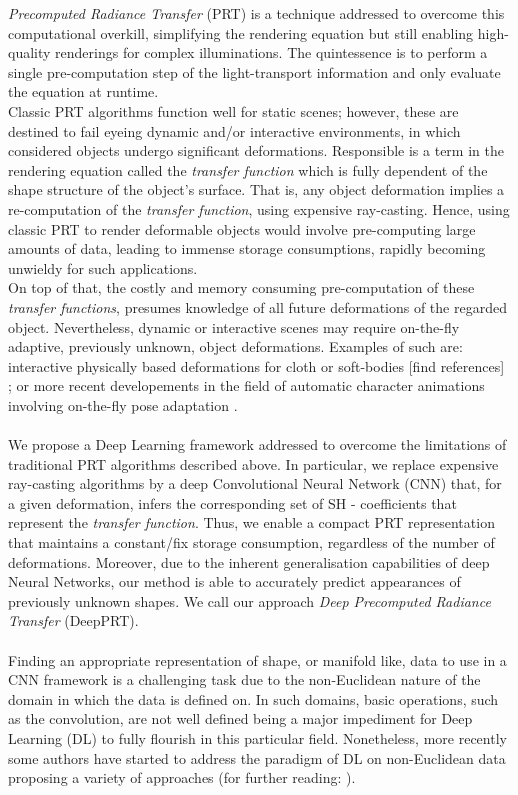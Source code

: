 \textit{Precomputed Radiance Transfer} (PRT) is a technique addressed to overcome this computational overkill, simplifying the rendering equation but still enabling high-quality renderings for complex illuminations. The quintessence is to perform a single pre-computation step of the light-transport information and only evaluate the equation at runtime.\\
Classic PRT algorithms function well for static scenes; however, these are destined to fail eyeing dynamic and/or interactive environments, in which considered objects undergo significant deformations.
Responsible is a term in the rendering equation called the \textit{transfer function} which is fully dependent of the shape structure of the object's surface. That is, any object deformation implies a re-computation of the \textit{transfer function},  using expensive ray-casting. Hence, using classic PRT to render deformable objects would involve pre-computing large amounts of data, leading to immense storage consumptions, rapidly becoming unwieldy for such applications.  \\
On top of that, the costly and memory consuming pre-computation of these \textit{transfer functions}, presumes knowledge of all future deformations of the regarded object. Nevertheless, dynamic or interactive scenes may require on-the-fly adaptive, previously unknown, object deformations. Examples of such are: 
interactive physically based deformations for cloth or soft-bodies [find references] ; 
or more recent developements in the field of automatic character animations involving on-the-fly pose adaptation \cite{DeepHuman,Holden2017, QuadrupedMotion}. \\
\\
We propose a Deep Learning framework addressed to overcome the limitations of traditional PRT algorithms described above. In particular, we replace expensive ray-casting algorithms by a deep Convolutional Neural Network (CNN) that, for a given deformation, infers the corresponding set of SH - coefficients that represent the \textit{transfer function}. 
Thus, we enable a compact PRT representation that maintains a constant/fix storage consumption, regardless of the number of deformations. Moreover, due to the inherent generalisation capabilities of deep Neural Networks, our method is able to accurately predict appearances of previously unknown shapes. We call our approach \textit{Deep Precomputed Radiance Transfer} (DeepPRT). \\
\\
Finding an appropriate representation of shape, or manifold like, data to use in a CNN framework is a challenging task due to the non-Euclidean nature of the domain in which the data is defined on. In such domains, basic operations, such as the convolution, are not well defined being a major impediment for Deep Learning (DL) to fully flourish in this particular field. Nonetheless, more recently some authors have started to address the paradigm of DL on non-Euclidean data proposing a variety of approaches \cite{Masci2015ShapeNetCN, Geometric_deep_learning, CNN_on_Torus} (for further reading: \cite{GeoDeepLearning}). \\
